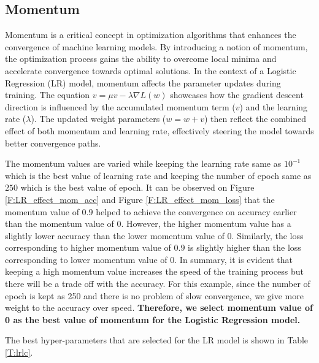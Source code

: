\documentclass[12pt, a4paper, twoside]{article}
\begin{document}
\subsection{Momentum}\label{SS:lr-mom}
Momentum is a critical concept in optimization algorithms that enhances the convergence of machine learning models. By introducing a notion of momentum, the optimization process gains the ability to overcome local minima and accelerate convergence towards optimal solutions. In the context of a Logistic Regression (LR) model, momentum affects the parameter updates during training. The equation $v = \mu v - \lambda \nabla L(w)$ showcases how the gradient descent direction is influenced by the accumulated momentum term ($v$) and the learning rate ($\lambda$). The updated weight parameters ($w = w + v$) then reflect the combined effect of both momentum and learning rate, effectively steering the model towards better convergence paths.
\par
The momentum values are varied while keeping the learning rate same as $10^{-1}$ which is the best value of learning rate and keeping the number of epoch same as $250$ which is the best value of epoch. It can be observed on Figure \ref{F:LR_effect_mom_acc} and Figure \ref{F:LR_effect_mom_loss} that the momentum value of $0.9$ helped to achieve the convergence on accuracy earlier than the momentum value of 0. However, the higher momentum value has a slightly lower accuracy than the lower momentum value of 0. Similarly, the loss corresponding to higher momentum value of $0.9$ is slightly higher than the loss corresponding to lower momentum value of 0. In summary, it is evident that keeping a high momentum value increases the speed of the training process but there will be a trade off with the accuracy. For this example, since the number of epoch is kept as 250 and there is no problem of slow convergence, we give more weight to the accuracy over speed. \textbf{Therefore, we select momentum value of 0 as the best value of momentum for the Logistic Regression model.} 
\par
The best hyper-parameters that are selected for the LR model is shown in Table \ref{T:lrlc}.
\end{document}
